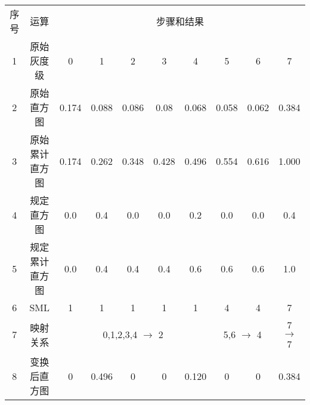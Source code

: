 \documentclass[12pt,UTF8]{ctexart}
\begin{document}
\begin{table}[]
\begin{tabular}{cccccccccc}
序号 & 运算      & \multicolumn{8}{c}{步骤和结果}                                                                                                 \\
1  & 原始灰度级   & 0        & 1        & 2        & 3       & 4       & 5                     & 6                    & 7                     \\
2  & 原始直方图   & 0.174    & 0.088    & 0.086    & 0.08    & 0.068   & 0.058                 & 0.062                & 0.384                 \\
3  & 原始累计直方图 & 0.174    & 0.262    & 0.348    & 0.428   & 0.496   & 0.554                 & 0.616                & 1.000                 \\
4  & 规定直方图   & 0.0      & 0.4      & 0.0      & 0.0     & 0.2     & 0.0                   & 0.0                  & 0.4                   \\
5  & 规定累计直方图 & 0.0      & 0.4      & 0.4      & 0.4     & 0.6     & 0.6                   & 0.6                  & 1.0                   \\
6  & SML     & 1        & 1        & 1        & 1       & 1       & 4                     & 4                    & 7                     \\
7  & 映射关系    & \multicolumn{5}{c}{0,1,2,3,4 $\to$ 2} & \multicolumn{2}{c}{5,6 $\to$ 4} & 7 $\to$ 7 \\
8  & 变换后直方图  & 0        & 0.496    & 0        & 0       & 0.120   & 0                     & 0                    & 0.384                
\end{tabular}
\end{table}
\end{document}
